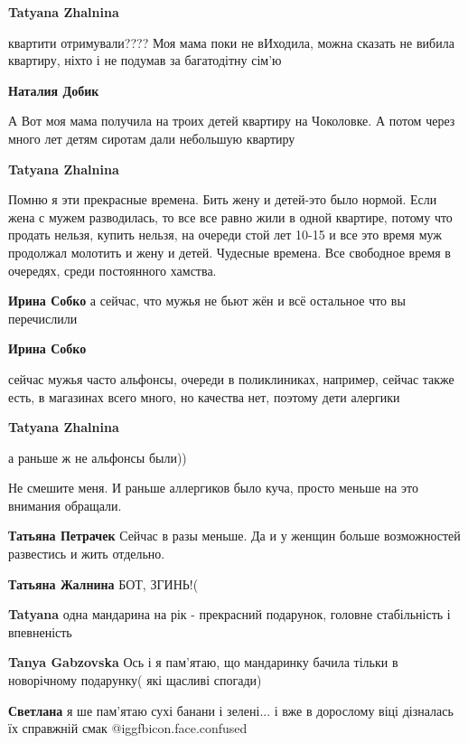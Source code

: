 \begin{itemize}
\begin{itemize}
\textbf{Tatyana Zhalnina} 

квартити отримували???? Моя мама поки не вИходила, можна сказать не вибила
квартиру, ніхто і не подумав за багатодітну сім'ю

\textbf{Наталия Добик} 

А Вот моя мама получила на троих детей квартиру на Чоколовке. А потом через
много лет детям сиротам дали небольшую квартиру


\textbf{Tatyana Zhalnina} 

Помню я эти прекрасные времена. Бить жену и детей-это было нормой. Если жена с
мужем разводилась, то все все равно жили в одной квартире, потому что продать
нельзя, купить нельзя, на очереди стой лет 10-15 и все это время муж продолжал
молотить и жену и детей. Чудесные времена. Все свободное время в очередях,
среди постоянного хамства.

\begin{itemize} %
\textbf{Ирина Собко} а сейчас, что мужья не бьют жён и всё остальное что вы перечислили

\textbf{Ирина Собко} 

сейчас мужья часто альфонсы, очереди в поликлиниках, например, сейчас также
есть, в магазинах всего много, но качества нет, поэтому дети алергики


\textbf{Tatyana Zhalnina} 

а раньше ж не альфонсы были))

Не смешите меня. И раньше аллергиков было куча, просто меньше на это внимания
обращали.

\textbf{Татьяна Петрачек} Сейчас в разы меньше. Да и у женщин больше возможностей развестись и жить отдельно.
\end{itemize} %

\textbf{Татьяна Жалнина} БОТ, ЗГИНЬ!(

\textbf{Tatyana} одна мандарина на рік - прекрасний подарунок, головне стабільність і впевненість

\begin{itemize} %
\textbf{Tanya Gabzovska}
Ось і я пам'ятаю, що мандаринку бачила тільки в новорічному подарунку( які щасливі спогади)

\textbf{Светлана} я ше пам’ятаю сухі банани і зелені... і вже в дорослому віці дізналась їх справжній смак  @igg{fbicon.face.confused} 
\end{itemize} %


\end{itemize}
\end{itemize}

